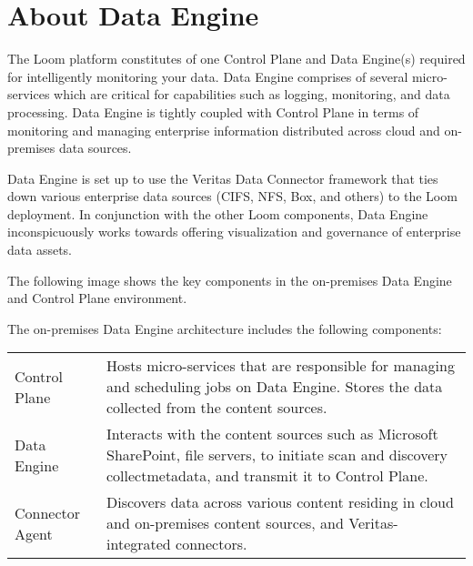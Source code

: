 \documentclass[letterpaper,10pt,english]{sphinxmanual}
\begin{document}
\chapter{About Data Engine}
\label{\detokenize{on_prem_dp_install_mcdmp:abt-dataengine}}\label{\detokenize{on_prem_dp_install_mcdmp:loom-on-premise-data-plane-deployment}}\label{\detokenize{on_prem_dp_install_mcdmp:about-data-engine}}\label{\detokenize{on_prem_dp_install_mcdmp:ing-com-on-prem-dp-install}}
The Loom platform constitutes of one Control Plane and Data Engine(s) required for intelligently monitoring your data. Data Engine comprises of several
micro-services which are critical for capabilities such as logging, monitoring, and data processing. Data Engine is tightly coupled with Control Plane in terms of
monitoring and managing enterprise information distributed across cloud and on-premises data sources.

Data Engine is set up to use the Veritas Data Connector framework that ties down various enterprise data sources (CIFS, NFS, Box, and others) to the Loom
deployment. In conjunction with the other Loom components, Data Engine inconspicuously works towards offering visualization and governance of enterprise
data assets.

The following image shows the key components in the on-premises Data Engine and Control Plane environment.

\begin{figure}[htbp]
\centering

\noindent{}
\end{figure}

The on-premises Data Engine architecture includes the following components:


\begin{savenotes}\sphinxattablestart
\centering
\begin{tabulary}{\linewidth}[t]{|T|T|}
\hline

&
\\
\hline
Control Plane
&
Hosts micro-services that are
responsible for managing and scheduling
jobs on Data Engine. Stores the data
collected from the content sources.
\\
\hline
Data Engine
&
Interacts with the content sources
such as Microsoft SharePoint, file
servers, to initiate scan and discovery
collectmetadata, and transmit it to
Control Plane.
\\
\hline
Connector Agent
&
Discovers data across various content
residing in cloud and on-premises
content sources, and
Veritas-integrated connectors.
\\
\hline
\end{tabulary}
\par
\sphinxattableend\end{savenotes}
\end{document}
